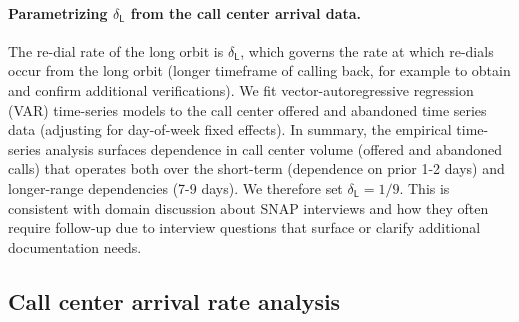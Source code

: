 \documentclass[manuscript,screen,authorversion]{acmart}
\begin{document}


\paragraph{Parametrizing  $\delta_{\mathsf{L}}$ from the call center arrival data.}
 The re-dial rate of the long orbit is $\delta_{\mathsf{L}}$, which governs the rate at which re-dials occur from the long orbit (longer timeframe of calling back, for example to obtain and confirm additional verifications). %
We fit vector-autoregressive regression (VAR) time-series models to the call center offered and abandoned time series data (adjusting for day-of-week fixed effects). In summary, the empirical time-series analysis surfaces dependence in call center volume (offered and abandoned calls) that operates both over the short-term (dependence on prior 1-2 days) and longer-range dependencies (7-9 days). We therefore set $\delta_{\mathsf{L}} = 1/9$. This is consistent with domain discussion about SNAP interviews and how they often require follow-up due to  interview questions that surface or clarify additional documentation needs. %

\subsection{Call center arrival rate analysis}\label{apx-callcenterarrival-ts}
\end{document}
